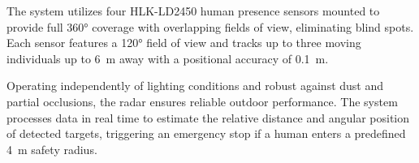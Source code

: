 
The system utilizes four HLK-LD2450 human presence sensors mounted to provide full \ang{360} coverage with overlapping fields of view, eliminating blind spots. Each sensor features a \ang{120} field of view and tracks up to three moving individuals up to \qty{6}{\metre} away with a positional accuracy of \qty{0.1}{\metre}. 

Operating independently of lighting conditions and robust against dust and partial occlusions, the radar ensures reliable outdoor performance. The system processes data in real time to estimate the relative distance and angular position of detected targets, triggering an emergency stop if a human enters a predefined \qty{4}{\metre} safety radius.
